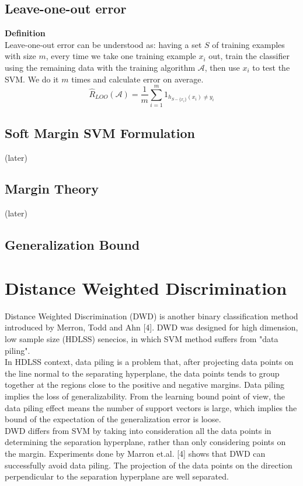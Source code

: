 \documentclass[12pt]{article}
\theoremstyle{definition}
\theoremstyle{remark}
\numberwithin{equation}{section}
\begin{document}
\subsection{Leave-one-out error}
\textbf{Definition} \\[0.2cm]
Leave-one-out error can be understood as: having a set $S$ of training examples with size $m$, every time we take one training example $x_i$ out, train the classifier using the remaining data with the training algorithm $\mathcal{A}$, then use $x_i$ to test the SVM. We do it $m$ times and calculate error on average.
\[\widehat{R}_{LOO}(\mathcal{A})=\frac{1}{m}\sum_{i=1}^{m}1_{h_{S-\{x_i\}}(x_i)\neq y_i}\]
\subsection{Soft Margin SVM Formulation}
(later)
\subsection{Margin Theory}
(later)
\subsection{Generalization Bound}
\section{Distance Weighted Discrimination}
Distance Weighted Discrimination (DWD) is another binary classification method introduced by Merron, Todd and Ahn [4]. DWD was designed for high dimension, low sample size (HDLSS) senecios, in which SVM method suffers from "data piling". \\[0.2cm]
In HDLSS context, data piling is a problem that, after projecting data points on the line normal to the separating hyperplane, the data points tends to group together at the regions close to the positive and negative margins. Data piling implies the loss of generalizability. From the learning bound point of view, the data piling effect means the number of support vectors is large, which implies the bound of the expectation of the generalization error is loose. \\[0.2cm]
DWD differs from SVM by taking into consideration all the data points in determining the separation hyperplane, rather than only considering points on the margin. Experiments done by Marron et.al. [4] shows that DWD can successfully avoid data piling. The projection of the data points on the direction perpendicular to the separation hyperplane are well separated.
\end{document}
